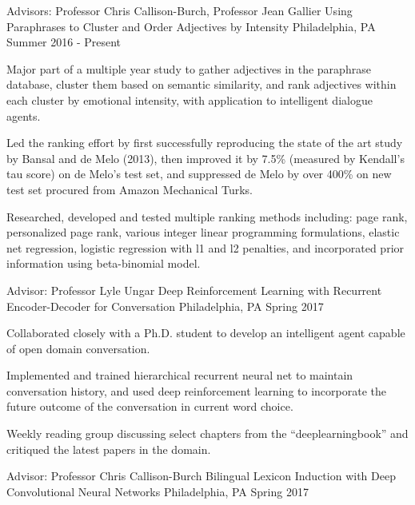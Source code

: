 \begin{cventries}
  \cventry
    {Advisors: Professor Chris Callison-Burch, Professor Jean Gallier}
    {Using Paraphrases to Cluster and Order Adjectives by Intensity}
    {Philadelphia, PA}
    {Summer 2016 - Present}
    {
      \begin{cvitems}
        \item {Major part of a multiple year study to gather adjectives in the paraphrase database, cluster them based on semantic similarity, and rank adjectives within each cluster by emotional intensity, with application to intelligent dialogue agents.}
        \item {Led the ranking effort by first successfully reproducing the state of the art study by Bansal and de Melo (2013), then improved it by 7.5\% (measured by Kendall's tau score) on de Melo’s test set, and suppressed de Melo by over 400\% on new test set procured from Amazon Mechanical Turks.}
        \item {Researched, developed and tested multiple ranking methods including: page rank, personalized page rank, various integer linear programming formulations, elastic net regression, logistic regression with l1 and l2 penalties, and incorporated prior information using beta-binomial model.}
      \end{cvitems}
    }
  \cventry
    {Advisor: Professor Lyle Ungar}
    {Deep Reinforcement Learning with Recurrent Encoder-Decoder for Conversation}
    {Philadelphia, PA}
    {Spring 2017}
    {
      \begin{cvitems}
        \item {Collaborated closely with a Ph.D. student to develop an intelligent agent capable of open domain conversation.}
        \item {Implemented and trained hierarchical recurrent neural net to maintain conversation history, and used deep reinforcement learning to incorporate the future outcome of the conversation in current word choice.}
        \item {Weekly reading group discussing select chapters from the “deeplearningbook” and critiqued the latest papers in the domain.}
      \end{cvitems}
    }
  \cventry
    {Advisor: Professor Chris Callison-Burch}
    {Bilingual Lexicon Induction with Deep Convolutional Neural Networks}
    {Philadelphia, PA}
    {Spring 2017}
    {
      \begin{cvitems}

\end{cvitems}}
\end{cventries}
